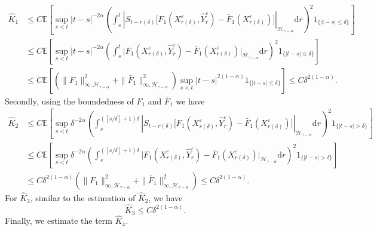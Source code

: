 \documentclass[10pt,a4paper]{article}
\numberwithin{equation}{section}
\begin{document}
\begin{align}\label{hatK1}
	\hat{K}_1 &\leq  C \mathbb E \left[ \sup_{s<t} |t-s|^{-2\alpha}
	\left( \int_s^t \left| S_{t-r(\delta)}  \big[ F_1(X_{r(\delta)}^\varepsilon,\hat{Y}_r^\varepsilon)-\bar{F}_1(X_{r(\delta)}^\varepsilon) \big] \right |_{\mathcal H_{\gamma-\alpha} } \mathrm{d} r  \right)^2  1_{\{|t-s|\leq \delta \}} \right] \nonumber\\
	&\leq  C \mathbb E \left[ \sup_{s<t} |t-s|^{-2\alpha}
	\left( \int_s^t \big| F_1(X_{r(\delta)}^\varepsilon,\hat{Y}_r^\varepsilon)-\bar{F}_1(X_{r(\delta)}^\varepsilon) \big|_{\mathcal H_{\gamma-\alpha} } \mathrm{d} r  \right)^2  1_{\{|t-s|\leq \delta \}} \right] \nonumber\\
	&\leq  C \mathbb E \left[ \left( \|F_1\|_{\infty, \mathcal H_{\gamma-\alpha}}^2+ \|\bar{F}_1\|_{\infty, \mathcal H_{\gamma-\alpha}}^2 \right)   \sup_{s<t} |t-s|^{2(1-\alpha)}  1_{\{|t-s|\leq \delta \}} \right]
	\leq C \delta^{2(1-\alpha)} .	
\end{align}
Secondly, using the boundedness of $F_1$ and $\bar{F}_1$ we have
\begin{align}\label{hatK2}
	\hat{K}_2 & \leq  C \mathbb E \left[ \sup_{s<t} \delta^{-2\alpha}
	\left( \int_s^{([s/\delta]+1)\delta}  \left| S_{t-r(\delta)}  \big[F_1(X_{r(\delta)}^\varepsilon,\hat{Y}_r^\varepsilon)-\bar{F}_1(X_{r(\delta)}^\varepsilon) \big] \right|_{\mathcal H_{\gamma-\alpha} } \mathrm{d} r \right)^2 1_{ \{|t-s|>\delta \}} \right] \nonumber\\
	& \leq C \mathbb E \left[ \sup_{s<t} \delta^{-2\alpha}
	\left( \int_s^{([s/\delta]+1)\delta}    \big|F_1(X_{r(\delta)}^\varepsilon,\hat{Y}_r^\varepsilon)-\bar{F}_1(X_{r(\delta)}^\varepsilon) \big|_{\mathcal H_{\gamma-\alpha} } \mathrm{d} r \right)^2 1_{ \{|t-s|>\delta \}} \right] \nonumber\\
	& \leq C \delta^{2(1-\alpha)}  \left(\|F_1\|_{\infty, \mathcal H_{\gamma-\alpha}}^2+ \|\bar{F}_1\|_{\infty, \mathcal H_{\gamma-\alpha}}^2\right)
	\leq C \delta^{2(1-\alpha)}.
\end{align}
For $\hat{K}_3$, similar to the estimation of $\hat{K}_2$, we have
\begin{equation}\label{hatK3}
\hat{K}_3 \leq C \delta^{2(1-\alpha)}.
\end{equation}
Finally, we estimate the term $\hat{K}_4$.
\end{document}

